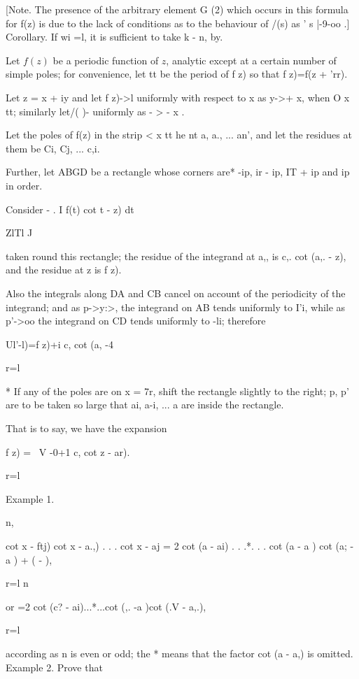 {[Note. The presence of the arbitrary element G (2) which occurs in
this formula for f(z) is due to the lack of conditions as to the
behaviour of /(s) as ' s |-9-oo .] Corollary. If wi =l, it is
sufficient to take k - n, by.


Let $f(z)$ be a periodic function of $z$, analytic except at a certain
number of simple poles; for convenience, let tt be the period of f z)
so that f z)=f(z + 'rr).

Let z = x + iy and let f z)->l uniformly with respect to x as y->+ x,
when O x tt; similarly let/( )- uniformly as - > - x .

Let the poles of f(z) in the strip < x tt he nt a, a., ... an', and
let the residues at them be Ci, Cj, ... c,i.

Further, let ABGD be a rectangle whose corners are* -ip, ir - ip, IT +
ip and ip in order.

Consider - . I f(t) cot t - z) dt

ZlTl J

taken round this rectangle; the residue of the integrand at a,, is
c,. cot (a,. - z), and the residue at z is f z).

Also the integrals along DA and CB cancel on account of the
periodicity of the integrand; and as p->y:>, the integrand on AB tends
uniformly to I'i, while as p'->oo the integrand on CD tends uniformly
to -li; therefore

Ul'-l)=f z)+i c, cot (a, -4

r=l

* If any of the poles are on x = 7r, shift the rectangle slightly to
the right; p, p' are to be taken so large that ai, a-i, ... a are
inside the rectangle.
%
%

That is to say, we have the expansion

f z) = \ V -0+1 c, cot z - ar).

  r=l

Example 1.

n,

cot x - ftj) cot x - a.,) . . . cot x - aj = 2 cot (a - ai) . . .*. .
. cot (a - a ) cot (a; - a ) + ( - ),

r=l n

or =2 cot (c? - ai)...*...cot (,. -a )cot (.V - a,.),

r=l

according as n is even or odd; the * means that the factor cot (a -
a,) is omitted. Example 2. Prove that

}
